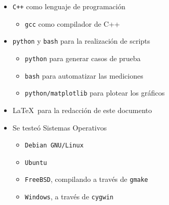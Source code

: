 \documentclass[11pt, a4paper, twoside]{article}
\begin{document}
\begin{itemize}
  \item \texttt{C++} como lenguaje de programación
    \begin{itemize}
      \item \texttt{gcc} como compilador de C++
    \end{itemize}
  \item \texttt{python} y \texttt{bash} para la realización de scripts
    \begin{itemize}
      \item \texttt{python} para generar casos de prueba
      \item \texttt{bash} para automatizar las mediciones
      \item \texttt{python/matplotlib} para plotear los gráficos
    \end{itemize}
  \item \LaTeX\ para la redacción de este documento
  \item Se testeó Sistemas Operativos \hfill
    \begin{itemize}
      \item \texttt{Debian GNU/Linux}
      \item \texttt{Ubuntu}
      \item \texttt{FreeBSD}, compilando a través de \texttt{gmake}
      \item \texttt{Windows}, a través de \texttt{cygwin}
    \end{itemize}
\end{itemize}


\end{document}
